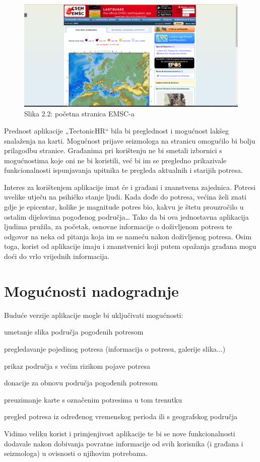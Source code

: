 \begin{figure}[H]
			\includegraphics[width=\textwidth]{slike/emsc1.PNG} %
			\caption{Slika 2.2: početna stranica EMSC-a}
			\label{fig:promjene2} %
		\end{figure}

{Prednost aplikacije „TectonicHR“ bila bi preglednost i mogućnost lakšeg snalaženja na karti. 
Mogućnost prijave seizmologa na stranicu omogućilo bi bolju prilagodbu stranice. Građanima pri korištenju ne bi smetali izbornici s mogućnostima koje oni ne bi koristili, već bi im se pregledno prikazivale funkcionalnosti ispunjavanja upitnika te pregleda aktualnih i starijih potresa. }

{Interes za korištenjem aplikacije imat će i građani i znanstvena zajednica. Potresi uvelike utječu na psihičko stanje ljudi. 
Kada dođe do potresa, većina želi znati gdje je epicentar, kolike je magnitude potres bio, kakvu je štetu prouzročilo u ostalim dijelovima pogođenog područja… 
Tako da bi ova jednostavna aplikacija ljudima pružila, za početak, osnovne informacije o doživljenom potresu te odgovor na neka od pitanja koja im se nameću nakon doživljenog potresa. 
Osim toga, korist od aplikacije imaju i znanstvenici koji putem opažanja građana mogu doći do vrlo vrijednih informacija. }\\		

\section{Mogućnosti nadogradnje}
{Buduće verzije aplikacije mogle bi uključivati mogućnosti:
\begin{packed_enum}
	\item umetanje slika područja pogođenih potresom
	\item pregledavanje pojedinog potresa (informacija o potresu, galerije slika...)
	\item prikaz područja s većim rizikom pojave potresa
	\item donacije za obnovu područja pogođenih potresom
	\item preuzimanje karte s označenim potresima u tom trenutku
	\item pregled potresa iz određenog vremenskog perioda ili s geografskog područja
\end{packed_enum}
Vidimo veliku korist i primjenjivost aplikacije te bi se nove funkcionalnosti dodavale nakon dobivanja povratne informacije od svih korisnika (i građana i seizmologa) u ovisnosti o njihovim potrebama.
}

	
\eject
	
	